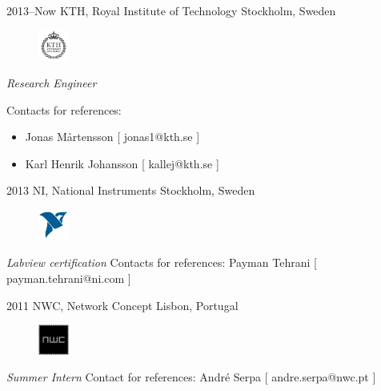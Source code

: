 \documentclass[]{friggeri-cv} %
\begin{document}
\begin{entrylist}
\entry
{2013--Now}
{KTH, Royal Institute of Technology}
{Stockholm, Sweden}
{
\begin{figure}
	\vspace{-20pt}
	\begin{center}
		\includegraphics[width=1cm,height=1cm]{kth}
	\end{center}
\end{figure}
\emph{Research Engineer} 

Contacts for references: 
\begin{itemize}
	\item Jonas Mårtensson [ jonas1@kth.se ]
	\item Karl Henrik Johansson [ kallej@kth.se ]
\end{itemize}
}
\end{entrylist}
\begin{entrylist}
\entry
{2013}
{NI, National Instruments}
{Stockholm, Sweden}
{
\begin{figure}
	\vspace{-20pt}
	\begin{center}
		\includegraphics[width=1cm,height=1cm]{ni}
	\end{center}
\end{figure}
\emph{Labview certification} 
Contacts for references: Payman Tehrani [ payman.tehrani@ni.com ]
}
\end{entrylist}

\begin{entrylist}
\entry
{2011}
{NWC, Network Concept}
{Lisbon, Portugal}
{
\begin{figure}
	\vspace{-20pt}
	\begin{center}
		\includegraphics[width=1cm,height=1cm]{nwc}
	\end{center}
\end{figure}
\emph{Summer Intern}
Contact for references: André Serpa [ andre.serpa@nwc.pt ]
}
\end{entrylist}
\end{document}
